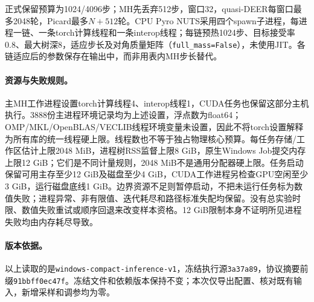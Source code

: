 正式保留预算为1024/4096步；MH先丢弃512步，窗口32，quasi-DEER每窗口最多2048轮，Picard最多$N+512$轮。CPU Pyro NUTS采用四个spawn子进程，每进程一链、一条torch计算线程和一条interop线程；每链预热1024步、目标接受率0.8、最大树深8，适应步长及对角质量矩阵（\texttt{full\_mass=False}），未使用JIT。各链适应后的参数保存在输出中，而非用表内MH步长替代。

\paragraph{资源与失败规则。}
主MH工作进程设置torch计算线程4、interop线程1，CUDA任务也保留这部分主机执行。3888份主进程环境记录均为上述设置，浮点数为float64；OMP/MKL/OpenBLAS/VECLIB线程环境变量未设置，因此不将torch设置解释为所有库的统一线程硬上限。线程数也不等于独占物理核心预算。每任务存储/工作区估计上限2048 MiB，进程树RSS监督上限8 GiB，原生Windows Job提交内存上限12 GiB；它们是不同计量规则，2048 MiB不是通用分配器硬上限。任务启动保留可用主存至少12 GiB及磁盘至少4 GiB，CUDA工作进程另检查GPU空闲至少3 GiB，运行磁盘底线1 GiB。边界资源不足则暂停启动，不把未运行任务标为数值失败；进程异常、非有限值、迭代耗尽和路径标准失配均保留。没有总实验时限、数值失败重试或顺序回退来改变样本资格。12 GiB限制本身不证明所见进程失败均由内存耗尽导致。

\paragraph{版本依据。}
以上读取的是\texttt{windows-compact-inference-v1}，冻结执行源\texttt{3a37a89}，协议摘要前缀\texttt{91bbff0ec47f}。冻结文件和依赖版本保持不变；本次仅导出配置、核对既有输入，新增采样和调参均为零。
